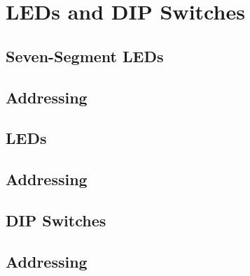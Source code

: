 \newpage

\section{LEDs and DIP Switches}

    \subsection{Seven-Segment LEDs}

    \subsection{Addressing}

    \subsection{LEDs}

    \subsection{Addressing}

    \subsection{DIP Switches}

    \subsection{Addressing}
